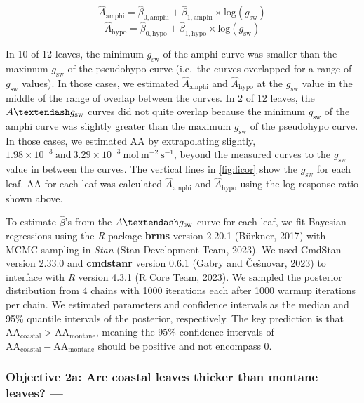 \documentclass[
  letterpaper,
  DIV=11,
  numbers=noendperiod]{scrartcl}
\begin{document}
\[\hat{A}_\text{amphi} = \hat{\beta}_{0,\text{amphi}} + \hat{\beta}_{1,\text{amphi}} \times \text{log}(g_\mathrm{sw})\]
\[\hat{A}_\text{hypo} = \hat{\beta}_{0,\text{hypo}} + \hat{\beta}_{1,\text{hypo}} \times \text{log}(g_\mathrm{sw})\]

In 10 of 12 leaves, the minimum \(g_\text{sw}\) of the amphi curve was
smaller than the maximum \(g_\text{sw}\) of the pseudohypo curve
(i.e.~the curves overlapped for a range of \(g_\text{sw}\) values). In
those cases, we estimated \(\hat{A}_\text{amphi}\) and
\(\hat{A}_\text{hypo}\) at the \(g_\mathrm{sw}\) value in the middle of
the range of overlap between the curves. In 2 of 12 leaves, the
\(A \textendash g_\text{sw}\) curves did not quite overlap because the
minimum \(g_\text{sw}\) of the amphi curve was slightly greater than the
maximum \(g_\text{sw}\) of the pseudohypo curve. In those cases, we
estimated \(\mathrm{AA}\) by extrapolating slightly,
\(1.98\times 10^{-3}~\text{and}~3.29\times 10^{-3}~\text{mol}~\text{m}^{-2}~\text{s}^{-1}\),
beyond the measured curves to the \(g_\mathrm{sw}\) value in between the
curves. The vertical lines in \autoref{fig:licor} show the
\(g_\text{sw}\) for each leaf. \(\mathrm{AA}\) for each leaf was
calculated \(\hat{A}_\text{amphi}\) and \(\hat{A}_\text{hypo}\) using
the log-response ratio shown above.

To estimate \(\hat{\beta}\)'s from the \(A \textendash g_\text{sw}\)
curve for each leaf, we fit Bayesian regressions using the \emph{R}
package \textbf{brms} version 2.20.1 (Bürkner, 2017) with MCMC sampling
in \emph{Stan} (Stan Development Team, 2023). We used CmdStan version
2.33.0 and \textbf{cmdstanr} version 0.6.1 (Gabry and Češnovar, 2023) to
interface with \emph{R} version 4.3.1 (R Core Team, 2023). We sampled
the posterior distribution from 4 chains with 1000 iterations each after
1000 warmup iterations per chain. We estimated parameters and confidence
intervals as the median and 95\% quantile intervals of the posterior,
respectively. The key prediction is that
\(\mathrm{AA}_\text{coastal} > \mathrm{AA}_\text{montane}\), meaning the
95\% confidence intervals of
\(\mathrm{AA}_\text{coastal} - \mathrm{AA}_\text{montane}\) should be
positive and not encompass 0.

\hypertarget{objective-2a-are-coastal-leaves-thicker-than-montane-leaves}{%
\subsubsection{Objective 2a: Are coastal leaves thicker than montane
leaves?
---}\label{objective-2a-are-coastal-leaves-thicker-than-montane-leaves}}
\end{document}
